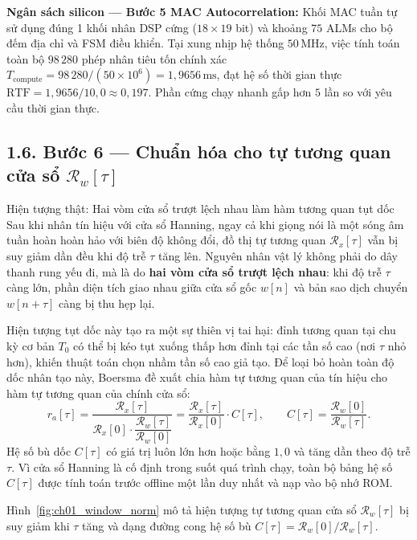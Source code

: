 \begin{costbox}
\textbf{Ngân sách silicon --- Bước 5 MAC Autocorrelation:}
Khối MAC tuần tự sử dụng đúng 1 khối nhân DSP cứng ($18 \times 19$ bit) và khoảng $75$ ALMs cho bộ đếm địa chỉ và FSM điều khiển. Tại xung nhịp hệ thống $50\,\text{MHz}$, việc tính toán toàn bộ $98\,280$ phép nhân tiêu tốn chính xác $T_{\mathrm{compute}} = 98\,280 / (50 \times 10^6) = 1{,}9656\,\text{ms}$, đạt hệ số thời gian thực $\text{RTF} = 1{,}9656 / 10{,}0 \approx 0{,}197$. Phần cứng chạy nhanh gấp hơn $5$ lần so với yêu cầu thời gian thực.
\end{costbox}

\subsection*{1.6. Bước 6 --- Chuẩn hóa cho tự tương quan cửa sổ $\mathcal{R}_w[\tau]$}

\begin{firstprin}{Hiện tượng thật: Hai vòm cửa sổ trượt lệch nhau làm hàm tương quan tụt dốc}
Sau khi nhân tín hiệu với cửa sổ Hanning, ngay cả khi giọng nói là một sóng âm tuần hoàn hoàn hảo với biên độ không đổi, đồ thị tự tương quan $\mathcal{R}_x[\tau]$ vẫn bị suy giảm dần đều khi độ trễ $\tau$ tăng lên. Nguyên nhân vật lý không phải do dây thanh rung yếu đi, mà là do \textbf{hai vòm cửa sổ trượt lệch nhau}: khi độ trễ $\tau$ càng lớn, phần diện tích giao nhau giữa cửa sổ gốc $w[n]$ và bản sao dịch chuyển $w[n+\tau]$ càng bị thu hẹp lại.

Hiện tượng tụt dốc này tạo ra một sự thiên vị tai hại: đỉnh tương quan tại chu kỳ cơ bản $T_0$ có thể bị kéo tụt xuống thấp hơn đỉnh tại các tần số cao (nơi $\tau$ nhỏ hơn), khiến thuật toán chọn nhầm tần số cao giả tạo. Để loại bỏ hoàn toàn độ dốc nhân tạo này, Boersma đề xuất chia hàm tự tương quan của tín hiệu cho hàm tự tương quan của chính cửa sổ:
\[
r_a[\tau] = \frac{\mathcal{R}_x[\tau]}{\mathcal{R}_x[0] \cdot \dfrac{\mathcal{R}_w[\tau]}{\mathcal{R}_w[0]}} = \frac{\mathcal{R}_x[\tau]}{\mathcal{R}_x[0]} \cdot C[\tau], \qquad C[\tau] = \frac{\mathcal{R}_w[0]}{\mathcal{R}_w[\tau]}.
\]
Hệ số bù dốc $C[\tau]$ có giá trị luôn lớn hơn hoặc bằng $1{,}0$ và tăng dần theo độ trễ $\tau$. Vì cửa sổ Hanning là cố định trong suốt quá trình chạy, toàn bộ bảng hệ số $C[\tau]$ được tính toán trước offline một lần duy nhất và nạp vào bộ nhớ ROM.
\end{firstprin}

Hình~\ref{fig:ch01_window_norm} mô tả hiện tượng tự tương quan cửa sổ $\mathcal{R}_w[\tau]$ bị suy giảm khi $\tau$ tăng và dạng đường cong hệ số bù $C[\tau] = \mathcal{R}_w[0] / \mathcal{R}_w[\tau]$.

